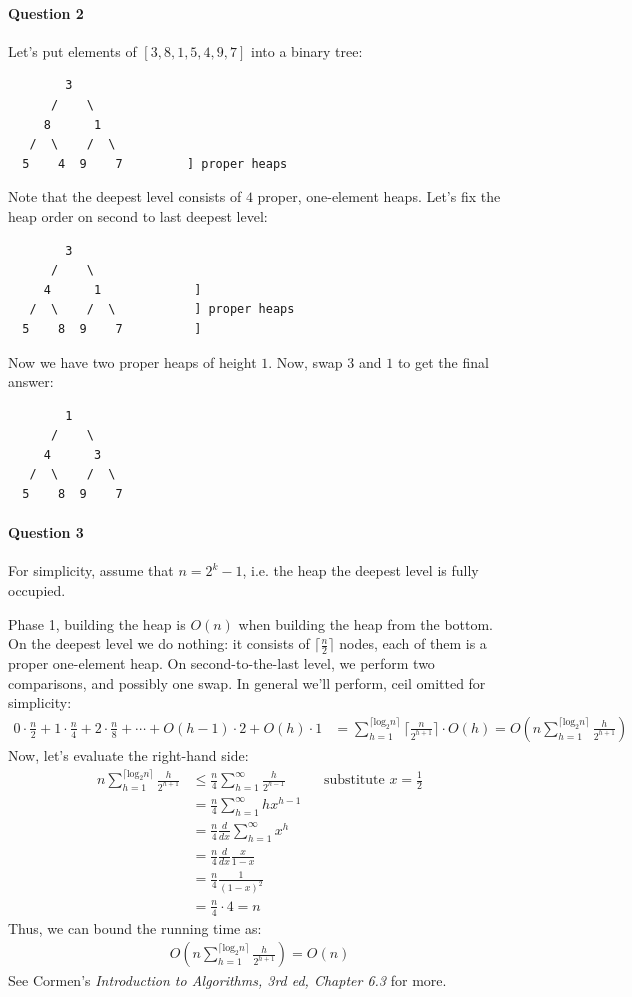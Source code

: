 \paragraph{Question 2}
Let's put elements of $[3,8,1,5,4,9,7]$ into a binary tree:
\begin{verbatim}
        3
      /    \
     8      1
   /  \    /  \
  5    4  9    7         ] proper heaps
\end{verbatim}
Note that the deepest level consists of $4$ proper, one-element heaps.
Let's fix the heap order on second to last deepest level:
\begin{verbatim}
        3
      /    \
     4      1             ] 
   /  \    /  \           ] proper heaps
  5    8  9    7          ] 
\end{verbatim}
Now we have two proper heaps of height $1$.
Now, swap $3$ and $1$ to get the final answer:
\begin{verbatim}
        1
      /    \
     4      3
   /  \    /  \
  5    8  9    7
\end{verbatim}

\paragraph{Question 3}
For simplicity, assume that $n=2^k - 1$, i.e. the heap the deepest level is fully occupied.

Phase 1, building the heap is $O(n)$ when building the heap from the bottom.
On the deepest level we do nothing: it consists of $\lceil \frac{n}{2} \rceil$ nodes, each of them is a proper one-element heap.
On second-to-the-last level, we perform two comparisons, and possibly one swap.
In general we'll perform, ceil omitted for simplicity:
\begin{align*}
    0\cdot \frac{n}{2} + 1 \cdot \frac{n}{4} + 2\cdot \frac{n}{8} + \cdots + O(h-1)\cdot 2 + O(h)\cdot 1 &= 
    \sum_{h=1}^{\lceil \text{log}_2 n \rceil} \lceil\frac{n}{2^{h+1}}\rceil\cdot O(h) 
    = O(n\sum_{h=1}^{\lceil \text{log}_2 n\rceil} \frac{h}{2^{h+1}})
\end{align*}
Now, let's evaluate the right-hand side:
\begin{align*}
    n\sum_{h=1}^{\lceil \text{log}_2 n\rceil} \frac{h}{2^{h+1}} 
    &\leq \frac{n}{4} \sum_{h=1}^{\infty} \frac{h}{2^{h-1}} && \text{substitute $x=\frac{1}{2}$} \\
    &= \frac{n}{4} \sum_{h=1}^{\infty} hx^{h-1} \\
    &= \frac{n}{4} \frac{d}{dx} \sum_{h=1}^{\infty} x^h\\
    &= \frac{n}{4} \frac{d}{dx} \frac{x}{1-x} \\
    &= \frac{n}{4} \frac{1}{(1-x)^2} \\
    &= \frac{n}{4} \cdot 4 = n
\end{align*}
Thus, we can bound the running time as:
\begin{align*}
    O(n\sum_{h=1}^{\lceil \text{log}_2 n\rceil} \frac{h}{2^{h+1}}) = O(n)
\end{align*}
See Cormen's \emph{Introduction to Algorithms, 3rd ed, Chapter 6.3} for more.

